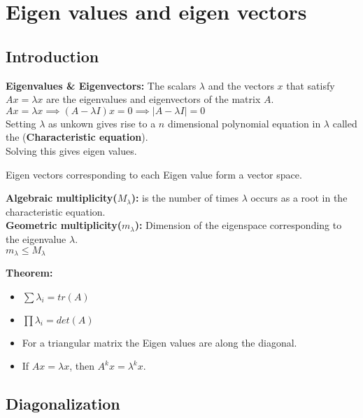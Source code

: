 \section{Eigen values and eigen vectors}

\subsection{Introduction}
\textbf{Eigenvalues \& Eigenvectors:}
The scalars $\lambda$ and the vectors $x$ that satisfy $Ax = \lambda x$ are the
eigenvalues and eigenvectors of the matrix $A$.\\
$Ax = \lambda x \implies (A - \lambda I)x = 0 \implies 
\mid A - \lambda I\mid = 0$\\

Setting $\lambda$ as unkown gives rise to a $n$ dimensional polynomial equation 
in $\lambda$ called the (\textbf{Characteristic equation}).\\
Solving this gives eigen values.\\

\begin{mdframed}[backgroundcolor=SlateGray2!40,linecolor=Firebrick4]
    Eigen vectors corresponding to each Eigen value form a vector space.
\end{mdframed}


\textbf{Algebraic multiplicity($M_{\lambda}$):} is the number of times $\lambda$
occurs as a root in the characteristic equation.\\
\textbf{Geometric multiplicity($m_{\lambda}$):} Dimension of the eigenspace 
corresponding to the eigenvalue $\lambda$.\\ 
$m_{\lambda} \leq M_{\lambda}$

\begin{mdframed}[backgroundcolor=gray!20]
\textbf{Theorem:}
\begin{itemize}
\item $\sum \lambda_i = tr(A)$	
\item $\prod \lambda_i = det(A)$
\item For a triangular matrix the Eigen values are along the diagonal.
\item If $Ax = \lambda x$, then $A^kx = \lambda ^k x$.
\end{itemize}
\end{mdframed}

\subsection{Diagonalization}

